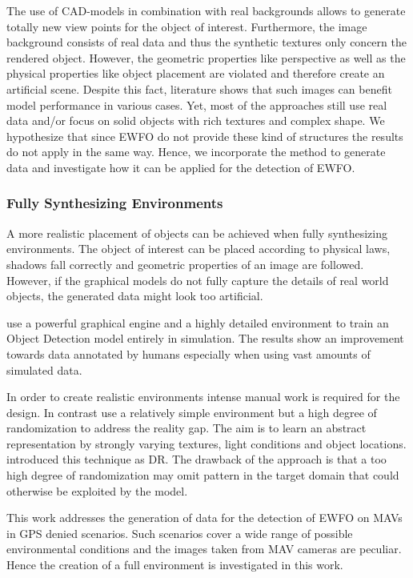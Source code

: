 The use of CAD-models in combination with real backgrounds allows to generate totally new view points for the object of interest. Furthermore, the image background consists of real data and thus the synthetic textures only concern the rendered object. However, the geometric properties like perspective as well as the physical properties like object placement are violated and therefore create an artificial scene. Despite this fact, literature shows that such images can benefit model performance in various cases. Yet, most of the approaches still use real data and/or focus on solid objects with rich textures and complex shape. We hypothesize that since \ac{EWFO} do not provide these kind of structures the results do not apply in the same way. Hence, we incorporate the method to generate data and investigate how it can be applied for the detection of \ac{EWFO}.

\subsubsection{Fully Synthesizing Environments}

A more realistic placement of objects can be achieved when fully synthesizing environments.  The object of interest can be placed according to physical laws, shadows fall correctly and geometric properties of an image are followed. However, if the graphical models do not fully capture the details of real world objects, the generated data might look too artificial.

\citeauthor{Johnson-Roberson2016} \cite{Johnson-Roberson2016} use a powerful graphical engine and a highly detailed environment to train an Object Detection model entirely in simulation. The results show an improvement towards data annotated by humans especially when using vast amounts of simulated data. 

In order to create realistic environments intense manual work is required for the design. In contrast \cite{Sadeghi2016, Tobin2017, Tremblay2018a} use a relatively simple environment but a high degree of randomization to address the reality gap. The aim is to learn an abstract representation by strongly varying textures, light conditions and object locations. \citeauthor{Tobin2017} introduced this technique as \ac{DR}. The drawback of the approach is that a too high degree of randomization may omit pattern in the target domain that could otherwise be exploited by the model. 

This work addresses the generation of data for the detection of \ac{EWFO} on \acp{MAV} in \ac{GPS} denied scenarios. Such scenarios cover a wide range of possible environmental conditions and the images taken from \ac{MAV} cameras are peculiar. Hence the creation of a full environment is investigated in this work. 


